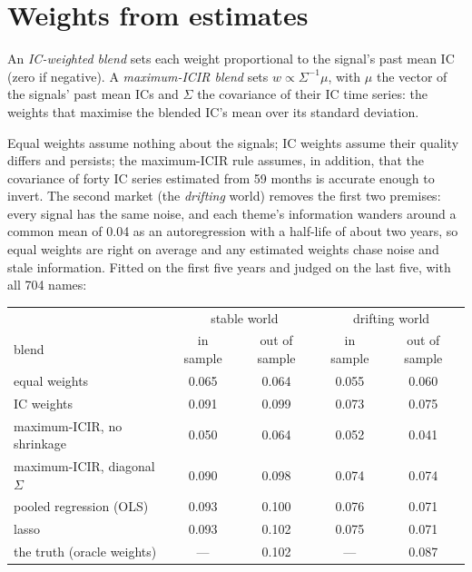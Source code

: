 \section{Weights from estimates}

\begin{definition}\label{def:rs:signal-combination:weights}
An \emph{IC-weighted blend} sets each weight proportional to the signal's past mean IC (zero if negative). A
\emph{maximum-ICIR blend} sets $w \propto \Sigma^{-1}\mu$, with $\mu$ the vector of the signals' past mean ICs and
$\Sigma$ the covariance of their IC time series: the weights that maximise the blended IC's mean over its standard deviation.
\end{definition}

Equal weights assume nothing about the signals; IC weights assume their quality differs and persists; the maximum-ICIR rule assumes, in
addition, that the covariance of forty IC series estimated from 59 months is accurate enough to invert. The second market (the
\emph{drifting} world) removes the first two premises: every signal has the same noise, and each theme's information wanders around a
common mean of 0.04 as an autoregression with a half-life of about two years, so equal weights are right on average and any estimated weights
chase noise and stale information. Fitted on the first five years and judged on the last five, with all 704 names:

\begin{center}
\small
\begin{tabular}{@{}lcccc@{}}
\toprule
 & \multicolumn{2}{c}{stable world} & \multicolumn{2}{c}{drifting world}\\
blend & in sample & out of sample & in sample & out of sample\\
\midrule
equal weights & 0.065 & 0.064 & 0.055 & 0.060\\
IC weights & 0.091 & 0.099 & 0.073 & 0.075\\
maximum-ICIR, no shrinkage & 0.050 & 0.064 & 0.052 & 0.041\\
maximum-ICIR, diagonal $\Sigma$ & 0.090 & 0.098 & 0.074 & 0.074\\
pooled regression (OLS) & 0.093 & 0.100 & 0.076 & 0.071\\
lasso & 0.093 & 0.102 & 0.075 & 0.071\\
the truth (oracle weights) & --- & 0.102 & --- & 0.087\\
\bottomrule
\end{tabular}
\end{center}

